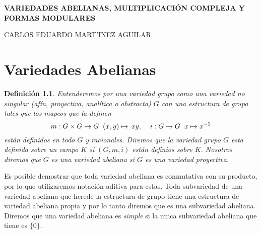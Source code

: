 \documentclass[letterpaper]{report}
\newtheorem{def.}{Definici\'on}[chapter]
\begin{document}
\begin{titlepage}
\begin{center}



\LARGE\textbf{VARIEDADES ABELIANAS, MULTIPLICACIÓN COMPLEJA Y FORMAS MODULARES}
\vspace*{0.5cm}



\small CARLOS EDUARDO MART'INEZ AGUILAR




 
\end{center}
\end{titlepage} 

\chapter{Variedades Abelianas}
\begin{def.}
Entenderemos por una variedad grupo como una variedad no singular (afín, proyectiva, analítica o abstracta) $G$ con una estructura de grupo tales que los mapeos que la definen
$$m:G\times G\rightarrow G\hspace{0.2cm}(x,y)\mapsto\, xy,\hspace{0.4cm} i:G\rightarrow G\hspace{0.2cm} x\mapsto x^{-1}$$
\noindent están definidos en todo $G$ y racionales.  Diremos que la variedad grupo $G$ esta definida sobre un campo $K$ si $(G,m,i)$ están definios sobre $K$. Nosotros  diremos que  $G$ es una \textit{variedad abeliana} si $G$ es una variedad proyectiva.
\end{def.}
Es posible demostrar que toda variedad abeliana es conmutativa con su producto, por lo que utilizaremos notación aditiva para estas. Toda subvariedad de una variedad abeliana que herede la estructura de grupo tiene una estructura de variedad abeliana propia y por lo tanto diremos que es una subvariedad abeliana. Diremos que una variedad abeliana es \textit{simple} si la unica subvariedad abeliana que tiene es $\lbrace 0\rbrace$.
\end{document}
